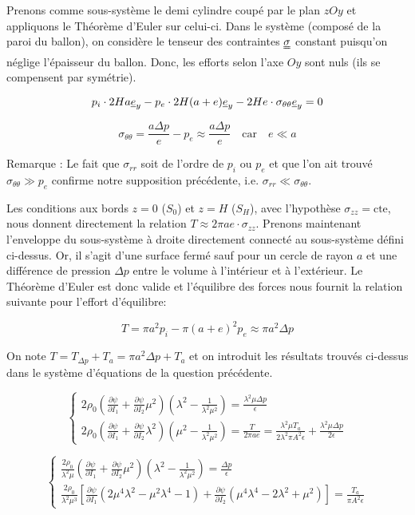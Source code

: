 \documentclass[a4paper,11pt]{article}
\newcommand{\FRAC}{\displaystyle\frac}
\newcommand{\tens}{\uuline}
\newcommand{\verseur}[1]{\uline{e}_{#1}}
\begin{document}
Prenons comme sous-système le demi cylindre coupé par le plan $zOy$ et appliquons le Théorème d'Euler sur celui-ci. Dans le système (composé de la paroi du ballon), on considère le tenseur des contraintes $\tens{\sigma}$ constant puisqu'on néglige l'épaisseur du ballon. Donc, les efforts selon l'axe $Oy$ sont nuls (ils se compensent par symétrie).

$$p_i \cdot 2Ha \verseur{y} - p_e \cdot 2H (a+e) \verseur{y} - 2He \cdot \sigma_{\theta\theta} \verseur{y} = 0$$

$$\sigma_{\theta\theta} = \frac{a\Delta p}{e} - p_e \approx  \frac{a\Delta p}{e} \quad\mathrm{car }\quad e \ll a$$

Remarque : Le fait que $\sigma_{rr}$ soit de l'ordre de $p_i$ ou $p_e$ et que l'on ait trouvé $\sigma_{\theta\theta} \gg p_e$ confirme notre supposition précédente, i.e. $\sigma_{rr} \ll \sigma_{\theta\theta}$.

Les conditions aux bords $z=0$ ($S_0$) et $z=H$ ($S_H$), avec l'hypothèse $\sigma_{zz} = \mathrm{cte}$, nous donnent directement la relation $T \approx 2\pi a e \cdot \sigma_{zz}$. Prenons maintenant l'enveloppe du sous-système à droite directement connecté au sous-système défini ci-dessus. Or, il s'agit d'une surface fermé sauf pour un cercle de rayon $a$ et une différence de pression $\Delta p$ entre le volume à l'intérieur et à l'extérieur. Le Théorème d'Euler est donc valide et l'équilibre des forces nous fournit la relation suivante pour l'effort d'équilibre:

$$T = \pi a^2 p_i - \pi (a+e)^2 p_e \approx \pi a^2 \Delta p$$

On note $T = T_{\Delta p} + T_a = \pi a^2 \Delta p + T_a$ et on introduit les résultats trouvés ci-dessus dans le système d'équations de la question précédente.

$$
\begin{cases}
2\rho_0 \left (\frac{\partial\psi}{\partial I_1} + \frac{\partial\psi}{\partial I_2} \mu^2 \right) \left ( \lambda^2 - \frac{1}{\lambda^2\mu^2} \right) = \frac{\lambda^2\mu \Delta p}{\epsilon} \\
2\rho_0 \left (\frac{\partial\psi}{\partial I_1} + \frac{\partial\psi}{\partial I_2} \lambda^2 \right) \left ( \mu^2 - \frac{1}{\lambda^2\mu^2} \right) = \frac{T}{2\pi ae} = \frac{\lambda^2\mu T_a}{2\lambda^2\pi A^2 \epsilon } + \frac{\lambda^2\mu\Delta p}{2\epsilon}
\end{cases}
$$

$$
\begin{cases}
\FRAC{2\rho_0}{\lambda^2\mu} \left (\FRAC{\partial\psi}{\partial I_1} + \FRAC{\partial\psi}{\partial I_2} \mu^2 \right) \left ( \lambda^2 - \FRAC{1}{\lambda^2\mu^2} \right) = \FRAC{\Delta p}{\epsilon} \\
\FRAC{2\rho_0}{\lambda^2\mu^3} \left [\FRAC{\partial\psi}{\partial I_1} (2\mu^4\lambda^2-\mu^2\lambda^4-1) + \FRAC{\partial\psi}{\partial I_2} (\mu^4 \lambda^4 - 2\lambda^2 + \mu^2) \right] = \FRAC{T_a}{\pi A^2 \epsilon}
\end{cases}
$$
\end{document}
